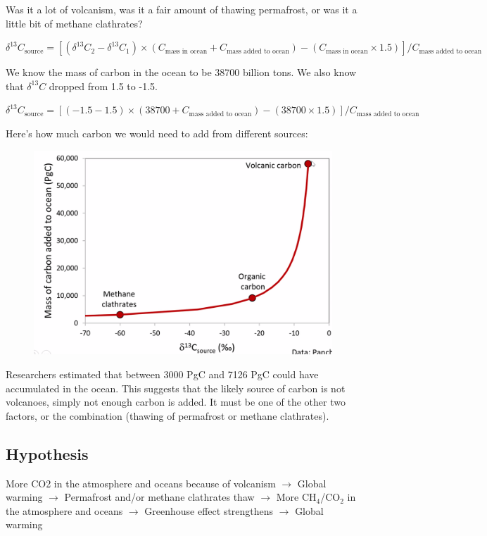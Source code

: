 Was it a lot of volcanism, was it a fair amount of thawing permafrost, or was
it a little bit of methane clathrates?

$\delta^{13}C_{\text{source}} = [
(\delta^{13}C_2-\delta^{13}C_1) \times
(C_{\text{mass in ocean}} + C_{\text{mass added to ocean}})
-
(C_{\text{mass in ocean}} \times 1.5)
] / C_{\text{mass added to ocean}}$

We know the mass of carbon in the ocean to be 38700 billion tons.
We also know that $\delta^{13}C$ dropped from 1.5 to -1.5.

$\delta^{13}C_{\text{source}} = [
(-1.5-1.5) \times
(38700 + C_{\text{mass added to ocean}})
-
(38700 \times 1.5)
] / C_{\text{mass added to ocean}}$

Here's how much carbon we would need to add from different sources:

\begin{figure}[H]
    \centering
    \includegraphics[width=0.75\linewidth]
    {content/img/adding_carbon_to_ocean.png}
\end{figure}

Researchers estimated that between 3000 PgC and 7126 PgC could have accumulated
in the ocean. This suggests that the likely source of carbon is not volcanoes,
simply not enough carbon is added. It must be one of the other two factors, or
the combination (thawing of permafrost or methane clathrates).

\subsection{Hypothesis}

More CO2 in the atmosphere and oceans because of volcanism
$\rightarrow$
Global warming
$\rightarrow$
Permafrost and/or methane clathrates thaw
$\rightarrow$
More CH$_4$/CO$_2$ in the atmosphere and oceans
$\rightarrow$
Greenhouse effect strengthens
$\rightarrow$
Global warming


